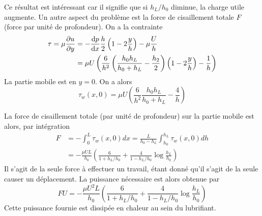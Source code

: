     Ce résultat est intéressant car il signifie que si $h_L/h_0$ diminue, la charge utile augmente. Un autre aspect du problème est la force de cisaillement totale $F$ (force par unité de profondeur). On a la contrainte
    \begin{equation}
      \begin{aligned}
        \tau = \mu \pdv{u}{y} &= -\dv{p}{x} \frac{h}{2} \left(1 - 2\frac{y}{h}\right) -\mu \frac{U}{h}\\
        &= \mu U \left(\frac{6}{h^2}\left(\frac{h_0 h_L}{h_0 + h_L} - \frac{h_2}{2}\right)\left(1- 2\frac{y}{h}\right) - \frac{1}{h}\right)
      \end{aligned}
    \end{equation}
    La partie mobile est en $y=0$. On a alors
    \begin{equation}
      \tau_w (x, 0) = \mu U\left(\frac{6}{h^2} \frac{h_0 h_L}{h_0 + h_L} - \frac{4}{h}\right)
    \end{equation}
    
    La force de cisaillement totale (par unité de profondeur) sur la partie mobile est alors, par intégration
    \begin{equation}
      \begin{aligned}
          F &= -\int_0^L \tau_w (x, 0) dx = \frac{L}{h_0 - h_L} \int_{h_0}^{h_L} \tau_w(x, 0) dh\\
          &= - \frac{\mu U L}{h_0} \left(\frac{6}{1+h_L/h_0} + \frac{4}{1-h_L/h_0}\log\frac{h_L}{h_0}\right)
      \end{aligned}
    \end{equation}
    Il s'agit de la seule force à effectuer un travail, étant donné qu'il s'agit de la seule causer un déplacement. La puissance nécessaire est alors obtenue par
    \begin{equation}
      F U = -\frac{\mu U^2L}{h_0} \left(\frac{6}{1+h_L/h_0} + \frac{4}{1-h_L/h_0}\log\frac{h_L}{h_0}\right)
    \end{equation}
    Cette puissance fournie est dissipée en chaleur au sein du lubrifiant.
